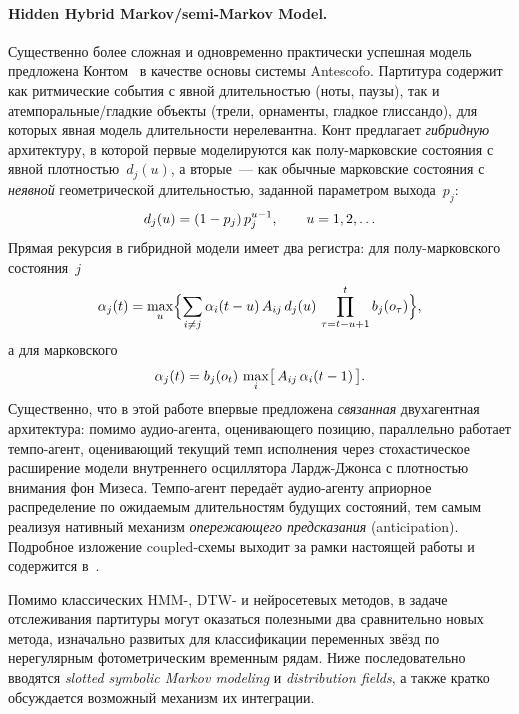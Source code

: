 \paragraph*{Hidden Hybrid Markov/semi-Markov Model.} Существенно
более сложная и одновременно практически успешная модель
предложена Контом~\cite{Cont2010} в качестве основы системы
Antescofo. Партитура содержит как ритмические события с явной
длительностью (ноты, паузы), так и атемпоральные/гладкие
объекты (трели, орнаменты, гладкое глиссандо), для которых
явная модель длительности нерелевантна. Конт предлагает
\textit{гибридную} архитектуру, в которой первые моделируются
как полу-марковские состояния с явной плотностью~$d_j(u)$, а
вторые~--- как обычные марковские состояния с
\textit{неявной} геометрической длительностью, заданной
параметром выхода~$p_j$:
\begin{equation}
d_j(u) = (1 - p_j)\,p_j^{u-1}, \qquad
u = 1, 2, \dots
\eqlab{cont-implicit-duration}
\end{equation}
Прямая рекурсия в гибридной модели имеет два регистра:
для полу-марковского состояния~$j$~\cite[уравн.~3]{Cont2010}
\begin{equation}
\alpha_j(t) = \max_{u}\Bigl\{
\sum_{i\ne j}\alpha_i(t-u)\,A_{ij}\,d_j(u)\,
\prod_{\tau=t-u+1}^{t} b_j(o_\tau)
\Bigr\},
\eqlab{cont-forward-semi}
\end{equation}
а для марковского~\cite[уравн.~4]{Cont2010}
\begin{equation}
\alpha_j(t) = b_j(o_t)\,\max_{i}\bigl[\,A_{ij}\,
\alpha_i(t-1)\,\bigr].
\eqlab{cont-forward-markov}
\end{equation}
Существенно, что в этой работе впервые предложена
\textit{связанная} двухагентная архитектура: помимо аудио-агента,
оценивающего позицию, параллельно работает темпо-агент,
оценивающий текущий темп исполнения через стохастическое
расширение модели внутреннего осциллятора Лардж-Джонса с
плотностью внимания фон Мизеса. Темпо-агент передаёт
аудио-агенту априорное распределение по ожидаемым длительностям
будущих состояний, тем самым реализуя нативный механизм
\textit{опережающего предсказания} (anticipation). Подробное
изложение coupled-схемы выходит за рамки настоящей работы и
содержится в~\cite[\S\,VII]{Cont2010}.

%
Помимо классических HMM-, DTW- и нейросетевых методов, в задаче
отслеживания партитуры могут оказаться полезными два
сравнительно новых метода, изначально развитых для классификации
переменных звёзд по нерегулярным фотометрическим временным
рядам. Ниже последовательно вводятся \textit{slotted symbolic
Markov modeling} и \textit{distribution fields}, а также
кратко обсуждается возможный механизм их интеграции.

